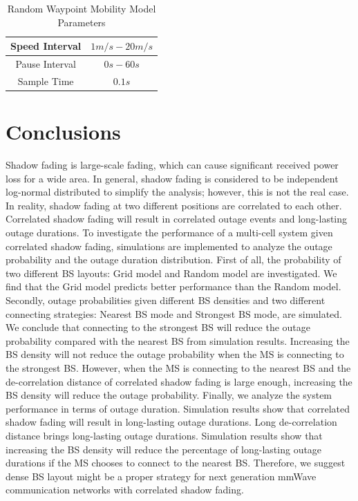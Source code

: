 \documentclass[journal,10pt]{IEEEtran}
\begin{document}
 \begin{table}
 \centering
 \caption{\label{RWP}Random Waypoint Mobility Model Parameters}

 \begin{tabular}{|c|c|}

 \hline
 Speed Interval & $1m/s - 20m/s$\\
 \hline
 Pause Interval & $0s - 60s$\\
 \hline
 Sample Time & $0.1s$\\
 \hline
 \end{tabular}

 \end{table}

 \section{Conclusions}
 \label{Conclusion}
 Shadow fading is large-scale fading, which can cause significant received power loss for a wide area. In general, shadow fading is considered to be independent log-normal distributed to simplify the analysis; however, this is not the real case. In reality, shadow fading at two different positions are correlated to each other. Correlated shadow fading will result in correlated outage events and long-lasting outage durations. To investigate the performance of a multi-cell system given correlated shadow fading, simulations are implemented to analyze the outage probability and the outage duration distribution. First of all, the probability of two different BS layouts: Grid model and Random model are investigated. We find that the Grid model predicts better performance than the Random model. Secondly, outage probabilities given different BS densities and two different connecting strategies: Nearest BS mode and Strongest BS mode, are simulated. We conclude that connecting to the strongest BS will reduce the outage probability compared with the nearest BS from simulation results. Increasing the BS density will not reduce the outage probability when the MS is connecting to the strongest BS. However, when the MS is connecting to the nearest BS and the de-correlation distance of correlated shadow fading is large enough, increasing the BS density will reduce the outage probability.  Finally, we analyze the system performance in terms of outage duration. Simulation results show that correlated shadow fading will result in long-lasting outage durations. Long de-correlation distance brings long-lasting outage durations. Simulation results show that increasing the BS density will reduce the percentage of long-lasting outage durations if the MS chooses to connect to the nearest BS. Therefore, we suggest dense BS layout might be a proper strategy for next generation mmWave communication networks with correlated shadow fading.
\end{document}
